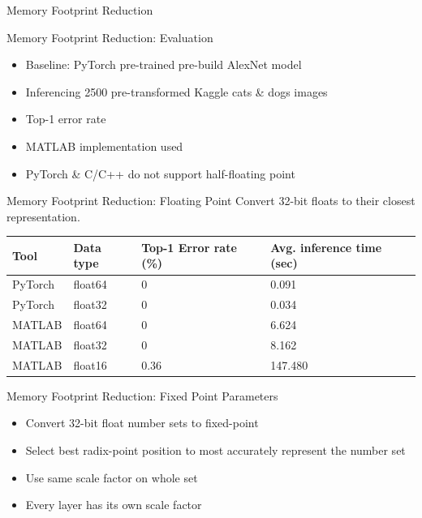 \begin{frame}{Memory Footprint Reduction}
\end{frame}

\begin{frame}{Memory Footprint Reduction: Evaluation}
	\begin{itemize}
		\item Baseline: PyTorch pre-trained pre-build AlexNet model
		\item Inferencing 2500 pre-transformed Kaggle cats \& dogs images
		\item Top-1 error rate
		\item MATLAB implementation used
		\item PyTorch \& C/C++ do not support half-floating point
	\end{itemize}
\end{frame}

\begin{frame}{Memory Footprint Reduction: Floating Point}
	\centering
	\large{Convert 32-bit floats to their closest representation.}
	\begin{table}[H]
		\centering
		\begin{tabular}{p{2cm} p{2cm} p{3cm} p{3cm}}
			\toprule
			\textbf{Tool} & \textbf{Data type} & \textbf{Top-1 Error rate (\%)} & \textbf{Avg. inference time (sec)} \\
			\midrule
			PyTorch       & float64            & 0                              & 0.091                              \\
			PyTorch       & float32            & 0                              & 0.034                              \\
			MATLAB        & float64            & 0                              & 6.624                              \\
			MATLAB        & float32            & 0                              & 8.162                              \\
			MATLAB        & float16            & 0.36                           & 147.480                            \\
			\bottomrule
		\end{tabular}
	\end{table}
\end{frame}

\begin{frame}{Memory Footprint Reduction: Fixed Point Parameters}
	\begin{itemize}
		\item Convert 32-bit float number sets to fixed-point
		\item Select best radix-point position to most accurately represent the number set
		\item Use same scale factor on whole set
		\item Every layer has its own scale factor
	\end{itemize}
\end{frame}

